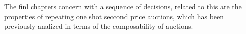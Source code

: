 The finl chapters concern with a sequence of decisions, related to this are the properties of repeating one shot seccond price auctions, which has been previously analized in terms of the composability of auctions. 







